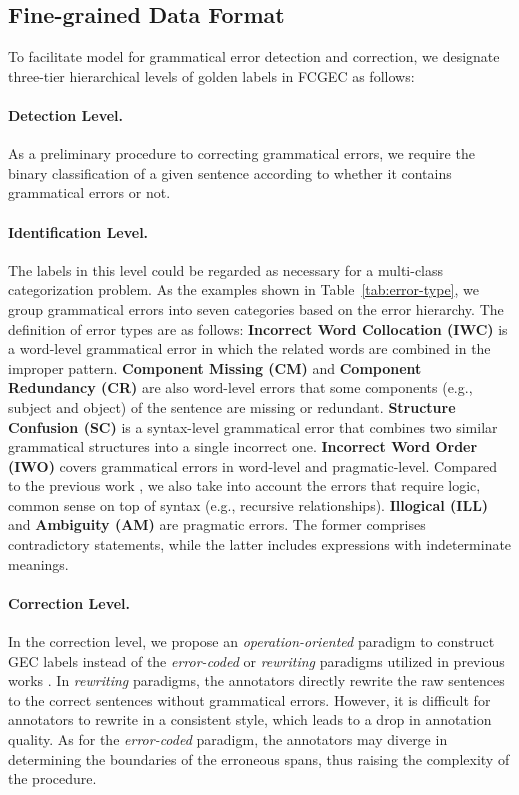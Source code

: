 \documentclass[11pt]{article}
\begin{document}
\subsection{Fine-grained Data Format}
\label{sec:data-format}

To facilitate model for grammatical error detection and correction, we designate three-tier hierarchical levels of golden labels in FCGEC as follows:

\paragraph{Detection Level.} As a preliminary procedure to correcting grammatical errors, we require the binary classification of a given sentence according to whether it contains grammatical errors or not.

\paragraph{Identification Level.} The labels in this level could be regarded as necessary for a multi-class categorization problem. As the examples shown in Table~\ref{tab:error-type}, we group grammatical errors into seven categories based on the error hierarchy. The definition of error types are as follows: \textbf{Incorrect Word Collocation (IWC)} is a word-level grammatical error in which the related words are combined in the improper pattern. \textbf{Component Missing (CM)} and \textbf{Component Redundancy (CR)} are also word-level errors that some components (e.g., subject and object) of the sentence are missing or redundant. \textbf{Structure Confusion (SC)} is a syntax-level grammatical error that combines two similar grammatical structures into a single incorrect one. \textbf{Incorrect Word Order (IWO)} covers grammatical errors in word-level and pragmatic-level. Compared to the previous work \cite{zhang2022mucgec}, we also take into account the errors that require logic, common sense on top of syntax (e.g., recursive relationships). \textbf{Illogical (ILL)} and \textbf{Ambiguity (AM)} are pragmatic errors. The former comprises contradictory statements, while the latter includes expressions with indeterminate meanings.

\paragraph{Correction Level.} In the correction level, we propose an \emph{operation-oriented} paradigm to construct GEC labels instead of the \emph{error-coded} or \emph{rewriting} paradigms utilized in previous works \cite{ng2014conll,sakaguchi2016reassessing}. In \emph{rewriting} paradigms, the annotators directly rewrite the raw sentences to the correct sentences without grammatical errors. However, it is difficult for annotators to rewrite in a consistent style, which leads to a drop in annotation quality. As for the \emph{error-coded} paradigm, the annotators may diverge in determining the boundaries of the erroneous spans, thus raising the complexity of the procedure.
\end{document}
